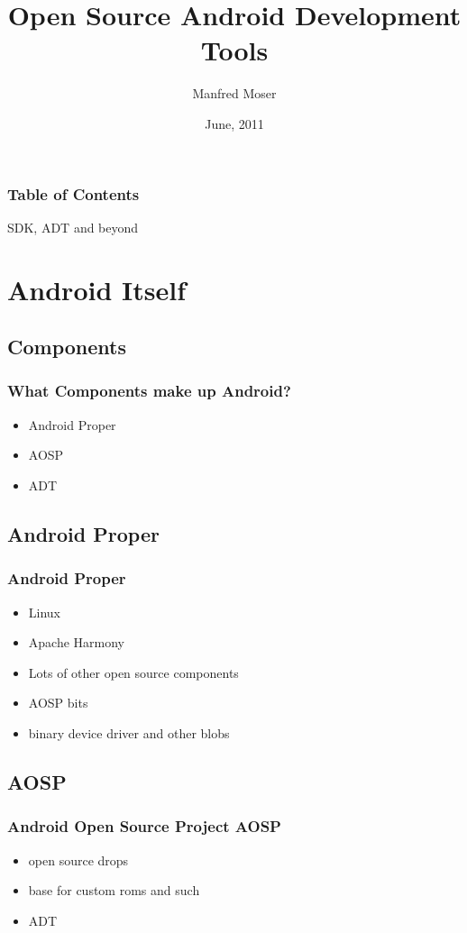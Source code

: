 \documentclass{beamer}
\title{Open Source Android Development Tools}
\author{Manfred Moser}
\date{June, 2011}
\institute[2011]{simpligility technologies inc.}
\begin{document}
\begin{frame}
  \titlepage 
\end{frame}

\begin{frame}
  \frametitle{Table of Contents}
  SDK, ADT and beyond
  \setcounter{tocdepth}{1}
  \tableofcontents
\end{frame}


\section{Android Itself}

  \subsection{Components}
    \begin{frame}
      \frametitle{What Components make up Android?}
      \begin{itemize}
        \item<1->Android Proper
        \item<2->AOSP
        \item<3->ADT
      \end{itemize}
    \end{frame}

  \subsection{Android Proper}
    \begin{frame}
    \frametitle{Android Proper}
    \begin{itemize}
      \item<1->Linux
      \item Apache Harmony 
      \item<2->Lots of other open source components
      \item<3->AOSP bits
      \item<4->binary device driver and other blobs
    \end{itemize}
    \end{frame}
  
  \subsection{AOSP}
    \begin{frame}
      \frametitle{Android Open Source Project AOSP}
      \begin{itemize}
        \item<1->open source drops
        \item<2->base for custom roms and such
        \item<3->ADT
      \end{itemize}
    \end{frame}
\end{document}
